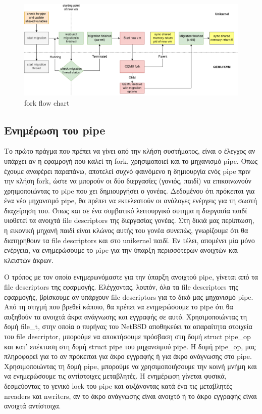 \begin{figure}[htp]
\centerline{\includegraphics[scale=0.4]{figures/fork_olo_colored.png}}
\caption{fork flow chart\label{fig4_8}}
\end{figure}

\subsection{Ενημέρωση του pipe}
Το πρώτο πράγμα που πρέπει να γίνει από την κλήση συστήματος, είναι ο έλεγχος αν
υπάρχει αν η εφαμρογή που καλεί τη fork, χρησιμοποιεί και το μηχανισμό pipe.
Όπως έχουμε αναφέρει
παραπάνω, αποτελεί συχνό φαινόμενο η δημιουργία ενός pipe πριν την κλήση fork,
ώστε να μπορούν οι δύο διεργασίες (γονιός, παιδί) να επικοινωνούν χρηιμοποιώντας
το pipe που χει δημιουργήσει ο γονέας. Δεδομένου ότι πρόκειται για ένα νέο
μηχανσιμό pipe, θα πρέπει να εκτελεστούν οι ανάλογες ενέργεις για τη σωστή
διαχείρηση του. Όπως και σε ένα συμβατικό λειτουργικό συτημα η διεργασία παιδί
υιοθετεί τα ανοιχτά file descriptors της διεργασίας γονέας. Στη δικιά μας
περίπτωση, η εικονική μηχανή παιδί είναι
κλώνος αυτής του γονέα συνεπώς, γνωρίζουμε ότι θα διατηρηθουν τα file descriptors
και στο unikernel παιδί. Εν τέλει, απομένει μία μόνο ενέργεια, να ενημερώσουμε το
pipe για την ύπαρξη περισσότερων ανοιχτών και κλειστών άκρων. 

Ο τρόπος με τον οποίο ενημερωνόμαστε για την ύπαρξη ανοιχτού pipe, γίνεται από
τα file descriptors της εφαρμογής. Ελέγχοντας, λοιπόν, όλα τα file 
descriptors της εφαρμογής, βρίσκουμε αν υπάρχουν file descriptors για το δικό
μας μηχανισμό pipe. Από τη στιγμή που βρεθεί κάποιο, θα πρέπει να ενημερώσουμε
το pipe ότι θα αυξηθούν τα ανοιχτά άκρα ανάγνωσης και εγγραφής σε αυτό.
Χρησιμοποιώντας τη δομή file\_t, στην οποία ο πυρήνας του NetBSD αποθηκεύει τα
απαραίτητα στοιχεία του file descriptor, μπορούμε να αποκτήσουμε πρόσβαση στη
δομή struct pipe\_op και κατ' επέκταση στη δομή struct pipe του μηχανσιμού pipe.
Η δομή pipe\_op, μας πληροφορεί για το αν πρόκειται για άκρο εγγραφής ή για άκρο
ανάγνωσης στο pipe. Χρησιμοποιώντας τη δομή pipe, μπορούμε να χρησιμοποιήσουμε
την κοινή μνήμη και να ενημερώσουμε τις αντίστοιχες μεταβλητές. Η ενημέρωση
γίνεται φυσικά, δεσμεύοντας το γενικό lock του pipe και αυξάνοντας κατά ένα τις
μεταβλητές nreaders και nwriters, αν το άκρο ανάγνωσης είναι ανοιχτό ή το άκρο
εγγραφής είναι ανοιχτά αντίστοιχα. 

